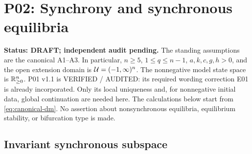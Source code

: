 
\section{P02: Synchrony and synchronous equilibria}
\label{sec:P02}

\noindent\textbf{Status: DRAFT; independent audit pending.}
The standing assumptions are the canonical A1--A3. In particular,
$n\ge5$, $1\le q\le n-1$, $a,k,c,g,h>0$, and the open extension
domain is $\mathcal{U}=(-1,\infty)^n$. The nonnegative model state space
is $\mathbb{R}_{\geq 0}^{n}$. P01 v1.1 is VERIFIED / AUDITED: its required wording
correction E01 is already incorporated. Only its local uniqueness
and, for nonnegative initial data, global continuation are needed here.
The calculations below start from \eqref{eq:canonical-dm}.
No assertion about nonsynchronous equilibria, equilibrium stability,
or bifurcation type is made.

\subsection{Invariant synchronous subspace}
\label{slot:P02-1}

